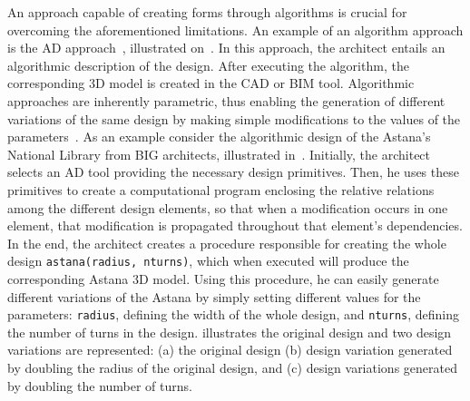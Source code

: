 	An approach capable of creating forms through algorithms is crucial for overcoming the aforementioned limitations. An example of an algorithm approach is the \ac{AD} approach~\cite{Branco2017AD}, illustrated on~. In this approach, the architect entails an algorithmic description of the design. After executing the algorithm, the corresponding 3D model is created in the \ac{CAD} or \ac{BIM} tool. Algorithmic approaches are inherently parametric, thus enabling the generation of different variations of the same design by making simple modifications to the values of the parameters~\cite{Leitao2014GD}. As an example consider the  algorithmic design of the Astana's National Library from BIG architects, illustrated in~. Initially, the architect selects an \ac{AD} tool providing the necessary design primitives. Then, he uses these primitives to create a computational program enclosing the relative relations among the different design elements, so that when a modification occurs in one element, that modification is propagated throughout that element's dependencies. In the end, the architect creates a procedure responsible for creating the whole design \texttt{astana(radius, nturns)}, which when executed will produce the corresponding Astana 3D model. Using this procedure, he can easily generate different variations of the Astana by simply setting different values for the parameters: \texttt{radius}, defining the width of the whole design, and \texttt{nturns}, defining the number of turns in the design.  illustrates the original design and two design variations are represented: (a) the original design (b) design variation generated by doubling the radius of the original design, and (c) design variations generated by doubling the number of turns.
	
